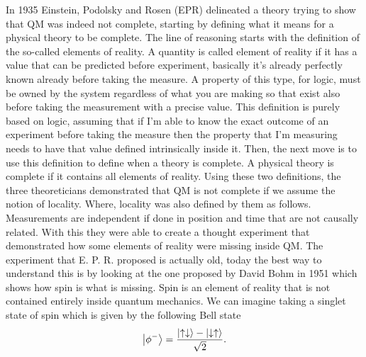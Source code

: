 In 1935 Einstein, Podolsky and Rosen (EPR) delineated a theory trying to show that QM was indeed not complete, starting by defining what it means for a physical theory to be complete. The line of reasoning starts with the definition of the so-called elements of reality.
{
    A quantity is called element of reality if it has a value that can be predicted before experiment, basically it's already perfectly known already before taking the measure. A property of this type, for logic, must be owned by the system regardless of what you are making so that exist also before taking the measurement with a precise value.
}
\noindent
This definition is purely based on logic, assuming that if I'm able to know the exact outcome of an experiment before taking the measure then the property that I'm measuring needs to have that value defined intrinsically inside it. Then, the next move is to use this definition to define when a theory is complete.
{
    A physical theory is complete if it contains all elements of reality.
}
\noindent
Using these two definitions, the three theoreticians demonstrated that QM is not complete if we assume the notion of locality. Where, locality was also defined by them as follows.
{
    Measurements are independent if done in position and time that are not causally related.
}
\noindent
With this they were able to create a thought experiment that demonstrated how some elements of reality were missing inside QM. The experiment that E. P. R. proposed is actually old, today the best way to understand this is by looking at the one proposed by David Bohm in 1951 which shows how spin is what is missing.
{
    Spin is an element of reality that is not contained entirely inside quantum mechanics.
}
{
    We can imagine taking a singlet state of spin which is given by the following Bell state
    \begin{equation}
        \ket{\phi^-} = \frac{\ket{\uparrow\downarrow} - \ket{\downarrow\uparrow}}{\sqrt{2}}.
    \end{equation}
}